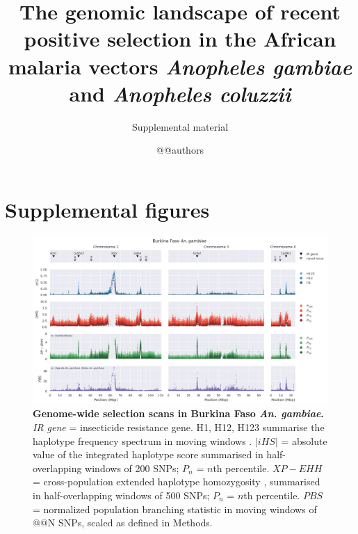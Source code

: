 \documentclass[a4paper,11pt,abstracton,hidelinks]{scrartcl}
\title{
The genomic landscape of recent positive selection in the African malaria vectors \textit{Anopheles gambiae} and \textit{Anopheles coluzzii}
}
\subtitle{\large{Supplemental material}}
\author{@@authors}
\begin{document}
\maketitle

\beginsupplement

\tableofcontents
\listoffigures

\clearpage


\section{Supplemental figures}


\begin{landscape}

\begin{figure}[t!]
	\begin{center}
		\includegraphics*[width=1.05\linewidth,center]{artwork/gwss_bf_gam_gw_ug_gam_gq_gam.png}
	\end{center}
	\caption[Genome-wide selection scans in Burkina Faso \textit{An. gambiae}]{
	\textbf{Genome-wide selection scans in Burkina Faso \textit{An. gambiae}.} 
	\textit{IR gene} = insecticide resistance gene. 
	H1, H12, H123 summarise the haplotype frequency spectrum in moving windows \citep{Garud2015}. 
	$|iHS|$ = absolute value of the integrated haplotype score \citep{Voight2006} summarised in half-overlapping windows of 200 SNPs; $P_{n}$ = $n$th percentile. 
	$XP-EHH$ = cross-population extended haplotype homozygosity \citep{Sabeti2007}, summarised in half-overlapping windows of 500 SNPs; $P_{n}$ = $n$th percentile.
	$PBS$ = normalized population branching statistic \citep{Crawford2017} in moving windows of @@N SNPs, scaled as defined in Methods.
	} 
	\label{fig:gwss_bf_gam}
\end{figure}



\end{landscape}
\end{document}
